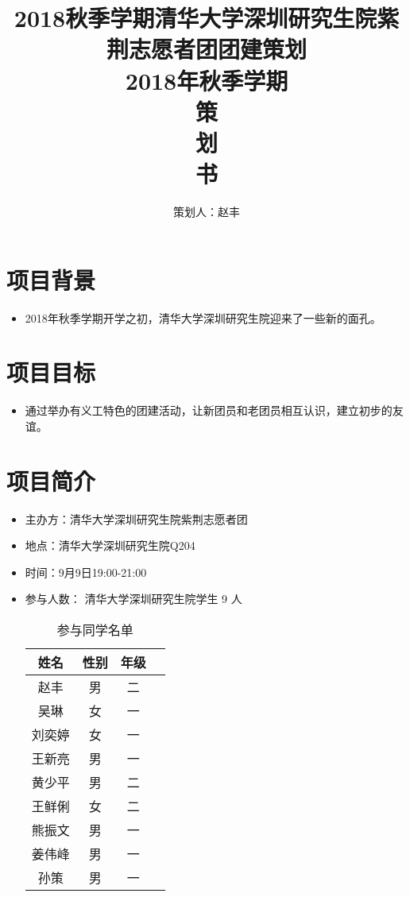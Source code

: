\documentclass[12pt]{ctexart}
\begin{document}
\title{
    \vspace{-0.5in}
    \textmd{\textbf{\huge{2018秋季学期清华大学深圳研究生院紫荆志愿者团\quad 团建策划}}}\\
    \normalsize\vspace{0.1in}\Large{2018年秋季学期}\\
    \vspace{1in}
     \textbf{\huge{策}}\\
    \vspace{1in}
     \textbf{\huge{划}}\\
    \vspace{1in}
     \textbf{\huge{书}}\\
    \vspace{1in}
}
\author{策划人：赵丰}
\maketitle
\thispagestyle{empty}
\pagebreak
\pagestyle{runningpage}

\section{项目背景}
\begin{itemize}
\item 2018年秋季学期开学之初，清华大学深圳研究生院迎来了一些新的面孔。
\end{itemize}
\section{项目目标}
\begin{itemize}
\item 通过举办有义工特色的团建活动，让新团员和老团员相互认识，建立初步的友谊。
\end{itemize}
\section{项目简介}
\begin{itemize}
\item 主办方：清华大学深圳研究生院紫荆志愿者团
\item 地点：清华大学深圳研究生院Q204
\item 时间：9月9日19:00-21:00
\item 参与人数： 清华大学深圳研究生院学生 9 人
\begin{table}[!ht]
\centering
\begin{tabular}{|c|c|c|c|}
\hline
姓名 & 性别 & 年级\\
\hline
赵丰 & 男 & 二 \\
吴琳 & 女 & 一 \\
刘奕婷 & 女 & 一 \\
王新亮 & 男 & 一 \\
黄少平 & 男 & 二 \\
王鲜俐 & 女 & 二 \\
熊振文 & 男 & 一 \\
姜伟峰 & 男 & 一\\
孙策 & 男 & 一 \\
\hline
\end{tabular}
\caption{参与同学名单}
\end{table}
\end{itemize}
\end{document}
